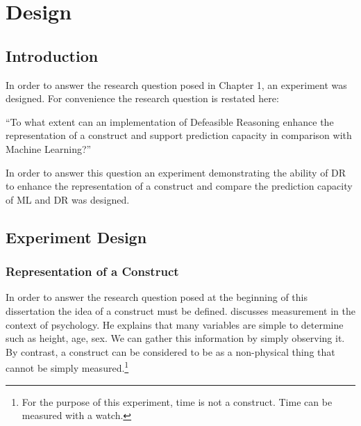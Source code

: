 
\chapter{Design} %

\label{Chapter3} %



\section{Introduction}

In order to answer the research question posed in Chapter 1, an experiment was designed. For convenience the research question is restated here:

``To what extent can an implementation of Defeasible Reasoning enhance the representation of a construct and support prediction capacity in comparison with Machine Learning?''

In order to answer this question an experiment demonstrating the ability of DR to enhance the representation of a construct and compare the prediction capacity of ML and DR was designed.



\section{Experiment Design}

\subsection{Representation of a Construct}
In order to answer the research question posed at the beginning of this dissertation the idea of a construct must be defined.
\cite{price2013research} discusses measurement in the context of psychology. He explains that many variables are simple to determine such as height, age, sex. We can gather this information by simply observing it. By contrast, a construct can be considered to be as a non-physical thing that cannot be simply measured.\footnote{For the purpose of this experiment, time is not a construct. Time can be measured with a watch.} 

